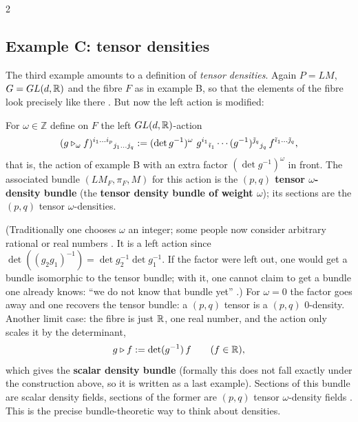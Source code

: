 \begin{paracol}{2}
\subsection{Example C: tensor densities}\label{sec:ab-density}
The third example amounts to a definition of \emph{tensor densities}. Again $P=LM$, $G=GL(d,\mathbb{R})$ and the fibre $F$ as in example B, so that the elements of the fibre look precisely like there    . But now the left action is modified:
\begin{definition}\label{def:ab-density}
For $\omega\in\mathbb Z$ define on $F$ the left $GL(d,\mathbb{R})$-action
\[
  (g\lact_\omega f)^{i_1\dots i_p}{}_{j_1\dots j_q}:=(\det g^{-1})^{\omega}\ g^{i_1}{}_{\tilde\imath_1}\cdots(g^{-1})^{\tilde\jmath_q}{}_{j_q}\,f^{\tilde\imath_1\dots\tilde\jmath_q},
\]
that is, the action of example B with an extra factor $(\det g^{-1})^\omega$ in front. The associated bundle $(LM_F,\pi_F,M)$ for this action is the \textbf{$(p,q)$ tensor $\omega$-density bundle} (the \textbf{tensor density bundle of weight $\omega$}); its sections are the $(p,q)$ tensor $\omega$-densities.          
\end{definition}
(Traditionally one chooses $\omega$ an integer; some people now consider arbitrary rational or real numbers . It is a left action since $\det((g_2g_1)^{-1})=\det g_2^{-1}\det g_1^{-1}$. If the factor were left out, one would get a bundle isomorphic to the tensor bundle; with it, one cannot claim to get a bundle one already knows: ``we do not know that bundle yet''  .) For $\omega=0$ the factor goes away and one recovers the tensor bundle: a $(p,q)$ tensor is a $(p,q)$ $0$-density. Another limit case: the fibre is just $\mathbb{R}$, one real number, and the action only scales it by the determinant,
\[
  g\mathbin{\triangleright} f:=\det(g^{-1})\,f\qquad(f\in\mathbb{R}),
\]
which gives the \textbf{scalar density bundle} (formally this does not fall exactly under the construction above, so it is written as a last example). Sections of this bundle are scalar density fields, sections of the former are $(p,q)$ tensor $\omega$-density fields      . This is the precise bundle-theoretic way to think about densities.


\end{paracol}
